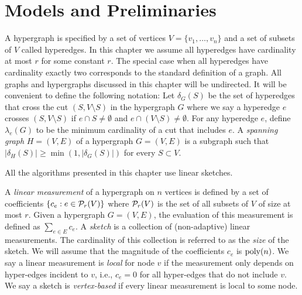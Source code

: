 \section{Models and Preliminaries}

A hypergraph is specified by a set of vertices $V=\{v_1, \ldots, v_n\}$ and a set of subsets of $V$ called hyperedges. In this chapter we assume all hyperedges have cardinality at most $r$ for some constant $r$. The special case when all hyperedges have cardinality exactly two corresponds to the standard definition of a graph. All graphs and hypergraphs discussed in this chapter will be undirected.
It will be convenient to define the following notation: Let $\delta_G(S)$ be the set of hyperedges that cross the cut $(S,V\setminus S)$ in the hypergraph $G$ where we say a hyperedge $e$ crosses $(S,V\setminus S)$ if $e\cap S\neq \emptyset$ and $e\cap (V\setminus S)\neq \emptyset$. For any hyperedge $e$, define $\lambda_e(G)$ to be the minimum cardinality of a cut that includes $e$. A \emph{spanning graph} $H=(V,E)$ of a hypergraph $G=(V,E)$ is a subgraph such that  $|\delta_{H}(S)|\geq \min (1, |\delta_G(S)|)$ for every $S\subset V$.



All the algorithms presented in this chapter use linear sketches.

\begin{definition}
A \emph{linear measurement} of a hypergraph on $n$ vertices is defined by a set of coefficients $\{c_e : e\in \P_r(V)\}$ where $\P_r(V)$ is the set of all subsets of $V$ of size at most $r$. Given a hypergraph $G=(V,E)$, the evaluation of this measurement is defined as 
$\sum_{e\in E} c_e$.
A \emph{sketch} is a collection of (non-adaptive) linear measurements. The cardinality of this collection is referred to as the \emph{size} of the sketch. We will assume that the magnitude of the coefficients $c_e$ is $\poly(n)$. We say a linear measurement is \emph{local} for node $v$ if the measurement only depends on hyper-edges incident to $v$, i.e., $c_e=0$ for all hyper-edges that do not include $v$. We say a sketch is \emph{vertex-based} if every linear measurement is local to some node.\end{definition}

